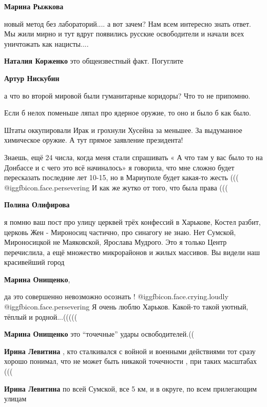 \begin{itemize}
\begin{itemize}
\textbf{Марина Рыжкова} 

новый метод без лабораторий.... а вот зачем? Нам всем интересно знать ответ. Мы
жили мирно и тут вдруг появились русские освободители и начали всех уничтожать
как нацисты....

\textbf{Наталия Корженко} это общеизвестный факт. Погуглите

\textbf{Артур Нискубин} 

а что во второй мировой были гуманитарные коридоры? Что то не припомню.

Если б нелох поменьше ляпал про ядерное оружие, то оно и было б как было.

Штаты оккупировали Ирак и грохнули Хусейна за меньшее. За выдуманное химическое
оружие. А тут прямое заявление президента!

\end{itemize} %


Знаешь, ещё 24 числа, когда меня стали спрашивать « А что там у вас было то на
Донбассе и с чего это всё начиналось» я говорила, что мне сложно будет
пересказать последние лет 10-15, но в Мариуполе будет какая-то жесть (((  @igg{fbicon.face.persevering}  И
как же жутко от того, что была права (((

\begin{itemize} %
\textbf{Полина Олифирова} 

я помню ваш пост про улицу церквей трёх конфессий в Харькове, Костел разбит,
церковь Жен - Мироносиц частично, про синагогу не знаю. Нет Сумской,
Мироносицкой не Маяковской, Ярослава Мудрого. Это я только Центр перечислила, а
ещё множество микрорайонов и жилых массивов. Вы видели наш красивейший город

\textbf{Марина Онищенко}, 

да это совершенно невозможно осознать !  @igg{fbicon.face.crying.loudly}
@igg{fbicon.face.persevering}  Я очень люблю Харьков. Какой-то такой уютный,
тёплый и родной...(((((


\textbf{Марина Онищенко} это \enquote{точечные} удары освободителей.((

\textbf{Ирина Левитина} , кто сталкивался с войной и военными действиями тот сразу хорошо понимал, что не может быть никакой точечности , при таких масштабах (((

\textbf{Ирина Левитина} по всей Сумской, все 5 км, и в округе, по всем прилегающим улицам


\end{itemize}
\end{itemize}
